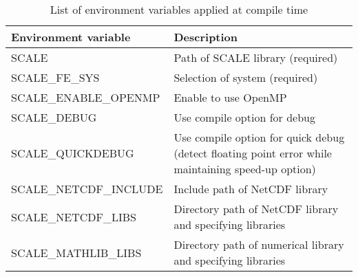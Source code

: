 \begin{table}[htb]
\begin{center}
\caption{List of environment variables applied at compile time}
\begin{tabularx}{150mm}{|l|X|} \hline
 \rowcolor[gray]{0.9} Environment variable & Description \\ \hline
 SCALE                    & Path of SCALE library (required) \\ \hline
 SCALE\_FE\_SYS           & Selection of system (required) \\ \hline
 SCALE\_ENABLE\_OPENMP    & Enable to use OpenMP \\ \hline
 SCALE\_DEBUG             & Use compile option for debug \\ \hline
 SCALE\_QUICKDEBUG        & Use compile option for quick debug (detect floating point error while maintaining speed-up option) \\ \hline
 SCALE\_NETCDF\_INCLUDE   & Include path of NetCDF library \\ \hline
 SCALE\_NETCDF\_LIBS      & Directory path of NetCDF library and specifying libraries \\ \hline
 SCALE\_MATHLIB\_LIBS     & Directory path of numerical library and specifying libraries \\ \hline
\end{tabularx}
\label{tab:env_var_list}
\end{center}
\end{table}


